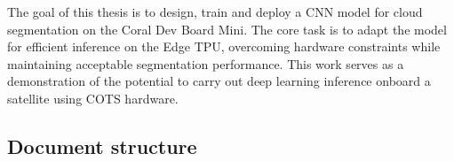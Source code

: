 {The goal of this thesis is to design, train and deploy a CNN model for cloud segmentation on the Coral Dev Board Mini. The core task is to adapt the model for efficient inference on the Edge TPU, overcoming hardware constraints while maintaining acceptable segmentation performance. This work serves as a demonstration of the potential to carry out deep learning inference onboard a satellite using COTS hardware.

\subsection{Document structure}

}